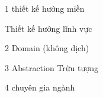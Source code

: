







1 thiết kế hướng miền

Thiết kế hướng lĩnh vực

2 Domain (không dịch)

3 Abstraction Trừu tượng

4 chuyên gia ngành
